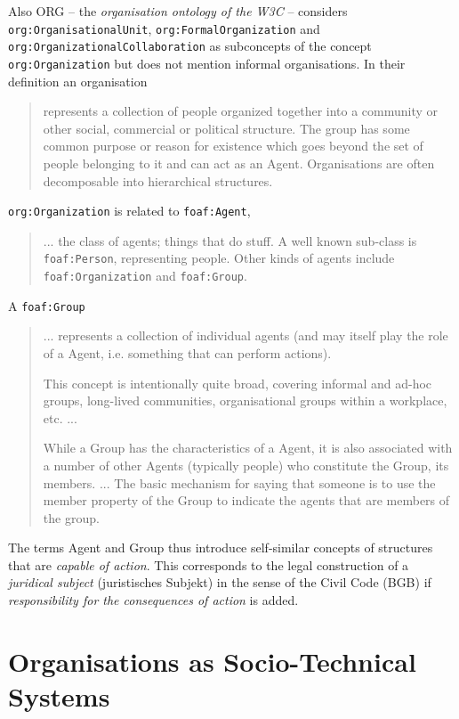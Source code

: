 \documentclass[11pt,a4paper]{article}
\begin{document}
Also ORG -- the \emph{organisation ontology of the W3C} \cite{vocab-org} --
considers \texttt{org:OrganisationalUnit}, \texttt{org:FormalOrganization} and
\texttt{org:OrganizationalCollaboration} as subconcepts of the concept
\texttt{org:Organization} but does not mention informal organisations.  In
their definition an organisation
\begin{quote}
  represents a collection of people organized together into a community or
  other social, commercial or political structure. The group has some common
  purpose or reason for existence which goes beyond the set of people
  belonging to it and can act as an Agent. Organisations are often
  decomposable into hierarchical structures.~\cite{vocab-org}
\end{quote}

\texttt{org:Organization} is related to \texttt{foaf:Agent}, 
\begin{quote}\raggedright
  ... the class of agents; things that do stuff. A well known sub-class is
  \texttt{foaf:Person}, representing people. Other kinds of agents include
  \texttt{foaf:Organization} and \texttt{foaf:Group}. \cite{foaf}
\end{quote}

A \texttt{foaf:Group}
\begin{quote}
  ... represents a collection of individual agents (and may itself play the
  role of a Agent, i.e. something that can perform actions).

  This concept is intentionally quite broad, covering informal and ad-hoc
  groups, long-lived communities, organisational groups within a workplace,
  etc. ...
  
  While a Group has the characteristics of a Agent, it is also associated with
  a number of other Agents (typically people) who constitute the Group, its
  members. ...  The basic mechanism for saying that someone is to use the
  member property of the Group to indicate the agents that are members of the
  group.
\end{quote}
The terms Agent and Group thus introduce self-similar concepts of structures
that are \emph{capable of action}. This corresponds to the legal construction
of a \emph{juridical subject} (juristisches Subjekt) in the sense of the Civil
Code (BGB) if \emph{responsibility for the consequences of action} is added.

\section{Organisations as Socio-Technical Systems}
\end{document}
